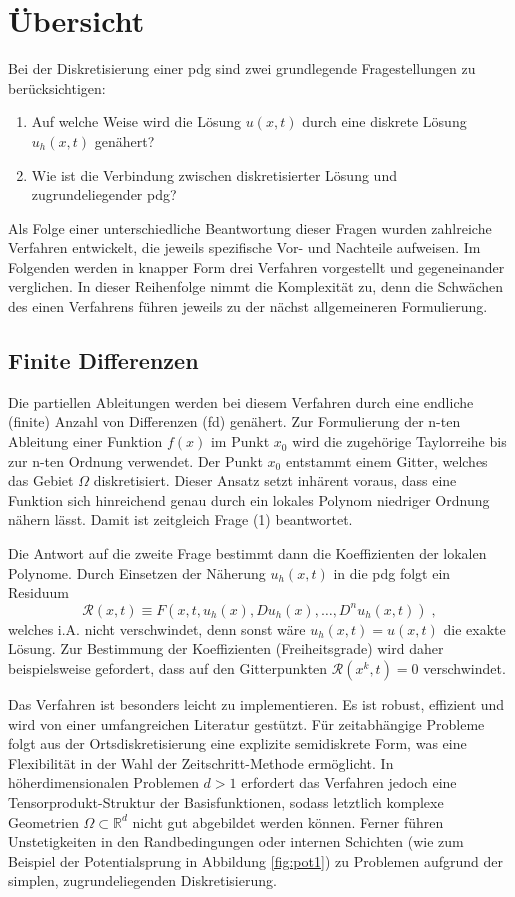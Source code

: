 \section{Übersicht}\label{sec:Übersicht}
Bei der Diskretisierung einer \ac{pdg} sind zwei grundlegende Fragestellungen zu berücksichtigen:
\begin{enumerate}
  \item Auf welche Weise wird die Lösung $u(x,t)$ durch eine diskrete Lösung $u_h(x,t)$ genähert?
  \item Wie ist die Verbindung zwischen diskretisierter Lösung und zugrundeliegender \ac{pdg}?
\end{enumerate}
Als Folge einer unterschiedliche Beantwortung dieser Fragen wurden zahlreiche Verfahren entwickelt, die jeweils spezifische Vor- und Nachteile aufweisen. Im Folgenden werden in knapper Form drei Verfahren vorgestellt und  gegeneinander verglichen. In dieser Reihenfolge nimmt die Komplexität zu, denn die Schwächen des einen Verfahrens führen jeweils zu der nächst allgemeineren Formulierung.

\subsection{Finite Differenzen}\label{sec:FD}
Die partiellen Ableitungen werden bei diesem Verfahren durch eine endliche (finite) Anzahl von Differenzen (\ac{fd}) genähert. Zur Formulierung der n-ten Ableitung einer Funktion $f(x)$ im Punkt $x_0$ wird die zugehörige Taylorreihe bis zur n-ten Ordnung verwendet. Der Punkt $x_0$ entstammt einem Gitter, welches das Gebiet $\Omega$ diskretisiert. Dieser Ansatz setzt inhärent voraus, dass eine Funktion sich hinreichend genau durch ein lokales Polynom niedriger Ordnung nähern lässt. Damit ist zeitgleich Frage (1) beantwortet.

Die Antwort auf die zweite Frage bestimmt dann die Koeffizienten der lokalen Polynome. Durch Einsetzen der Näherung $u_h(x,t)$ in die \ac{pdg} folgt ein Residuum
\begin{equation*}
  \mathcal{R}(x,t)\equiv F(x,t, u_h(x), Du_h(x), \dots, D^nu_h(x,t)) \; ,
\end{equation*}
welches i.A. nicht verschwindet, denn sonst wäre ${u_h(x,t) = u(x,t)}$ die exakte Lösung. Zur Bestimmung der Koeffizienten (Freiheitsgrade) wird daher beispielsweise gefordert, dass auf den Gitterpunkten ${\mathcal{R}(x^k,t)=0}$ verschwindet.

Das Verfahren ist besonders leicht zu implementieren. Es ist robust, effizient und wird von einer umfangreichen Literatur gestützt. Für zeitabhängige Probleme folgt aus der Ortsdiskretisierung eine explizite semidiskrete Form, was eine Flexibilität in der Wahl der Zeitschritt-Methode ermöglicht. In höherdimensionalen Problemen $d>1$ erfordert das Verfahren jedoch eine Tensorprodukt-Struktur der Basisfunktionen, sodass letztlich komplexe Geometrien $\Omega\subset{\mathbb{R}^d}$ nicht gut abgebildet werden können. Ferner führen Unstetigkeiten in den Randbedingungen oder internen Schichten (wie zum Beispiel der Potentialsprung in Abbildung \ref{fig:pot1}) zu Problemen aufgrund der simplen, zugrundeliegenden Diskretisierung.

